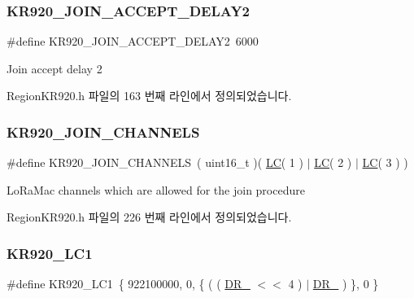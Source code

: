 \subsubsection{\texorpdfstring{K\+R920\+\_\+\+J\+O\+I\+N\+\_\+\+A\+C\+C\+E\+P\+T\+\_\+\+D\+E\+L\+A\+Y2}{KR920\_JOIN\_ACCEPT\_DELAY2}}
{\footnotesize\ttfamily \#define K\+R920\+\_\+\+J\+O\+I\+N\+\_\+\+A\+C\+C\+E\+P\+T\+\_\+\+D\+E\+L\+A\+Y2~6000}

Join accept delay 2 

Region\+K\+R920.\+h 파일의 163 번째 라인에서 정의되었습니다.

\mbox{\label{group___r_e_g_i_o_n_k_r920_ga12eb4db7cb18ecc9f503f7f67a245398}} 
\subsubsection{\texorpdfstring{K\+R920\+\_\+\+J\+O\+I\+N\+\_\+\+C\+H\+A\+N\+N\+E\+LS}{KR920\_JOIN\_CHANNELS}}
{\footnotesize\ttfamily \#define K\+R920\+\_\+\+J\+O\+I\+N\+\_\+\+C\+H\+A\+N\+N\+E\+LS~( uint16\+\_\+t )( \mbox{\hyperlink{group___r_e_g_i_o_n_ga12fa17e5c1016e01a9d82c25027deb1b}{LC}}( 1 ) $\vert$ \mbox{\hyperlink{group___r_e_g_i_o_n_ga12fa17e5c1016e01a9d82c25027deb1b}{LC}}( 2 ) $\vert$ \mbox{\hyperlink{group___r_e_g_i_o_n_ga12fa17e5c1016e01a9d82c25027deb1b}{LC}}( 3 ) )}

Lo\+Ra\+Mac channels which are allowed for the join procedure 

Region\+K\+R920.\+h 파일의 226 번째 라인에서 정의되었습니다.

\mbox{\label{group___r_e_g_i_o_n_k_r920_gac390f2ca3193094872899d5062f6e9c9}} 
\subsubsection{\texorpdfstring{K\+R920\+\_\+\+L\+C1}{KR920\_LC1}}
{\footnotesize\ttfamily \#define K\+R920\+\_\+\+L\+C1~\{ 922100000, 0, \{ ( ( \mbox{\hyperlink{group___r_e_g_i_o_n_ga872e12c82020c02a7f70a1c6ed1375df}{D\+R\+\_}} $<$$<$ 4 ) $\vert$ \mbox{\hyperlink{group___r_e_g_i_o_n_ga6c4ef966b4f3d5eb7597b087f2b97095}{D\+R\+\_}} ) \}, 0 \}}

